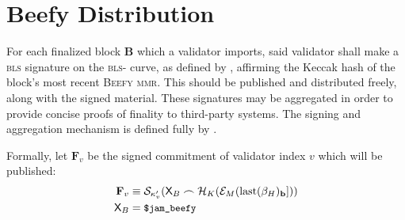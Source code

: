 \section{Beefy Distribution}\label{sec:beefy}

For each finalized block $\mathbf{B}$ which a validator imports, said validator shall make a \textsc{bls} signature on the \textsc{bls}- curve, as defined by \cite{bls12-381}, affirming the Keccak hash of the block's most recent \textsc{Beefy} \textsc{mmr}. This should be published and distributed freely, along with the signed material. These signatures may be aggregated in order to provide concise proofs of finality to third-party systems. The signing and aggregation mechanism is defined fully by \cite{cryptoeprint:2022/1611}.

Formally, let $\mathbf{F}_v$ be the signed commitment of validator index $v$ which will be published:
\begin{align}\label{eq:beefysignedcommitment}
  \mathbf{F}_v &\equiv \mathcal{S}_{\kappa'_v}(\mathsf{X}_B\frown\mathcal{H}_K(\mathcal{E}_M(\text{last}(\beta_H)_\mathbf{b}]))\\
  \mathsf{X}_B &= \text{{\small \texttt{\$jam\_beefy}}}
\end{align}

